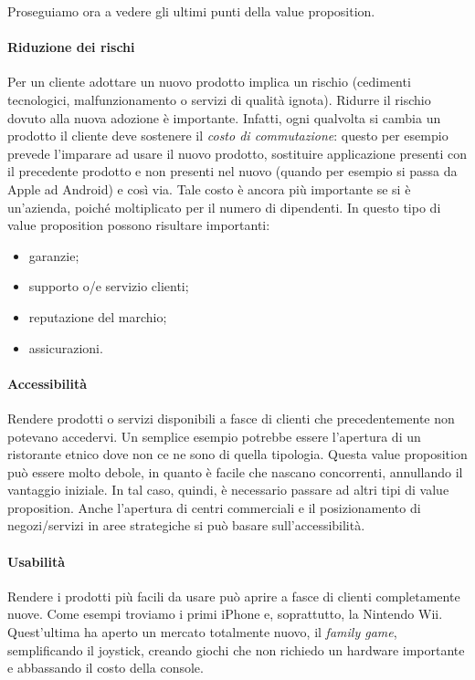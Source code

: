Proseguiamo ora a vedere gli ultimi punti della value proposition.

\paragraph*{Riduzione dei rischi} Per un cliente adottare un nuovo prodotto
implica un rischio (cedimenti tecnologici, malfunzionamento o servizi di
qualità ignota). Ridurre il rischio dovuto alla nuova adozione è importante.
Infatti, ogni qualvolta si cambia un prodotto il cliente deve sostenere il
\emph{costo di commutazione}: questo per esempio prevede l'imparare ad usare il
nuovo prodotto, sostituire applicazione presenti con il precedente prodotto e
non presenti nel nuovo (quando per esempio si passa da Apple ad Android) e così
via. Tale costo è ancora più importante se si è un'azienda, poiché moltiplicato
per il numero di dipendenti. In questo tipo di value proposition possono
risultare importanti:
\begin{itemize}
\item garanzie;
\item supporto o/e servizio clienti;
\item reputazione del marchio;
\item assicurazioni.
\end{itemize}

\paragraph*{Accessibilità} Rendere prodotti o servizi disponibili a fasce
di clienti che precedentemente non potevano accedervi. Un semplice esempio
potrebbe essere l'apertura di un ristorante etnico dove non ce ne sono di
quella tipologia. Questa value proposition può essere molto debole, in quanto
è facile che nascano concorrenti, annullando il vantaggio iniziale. In tal
caso, quindi, è necessario passare ad altri tipi di value proposition.
Anche l'apertura di centri commerciali e il posizionamento di negozi/servizi in
aree strategiche si può basare sull'accessibilità.

\paragraph*{Usabilità} Rendere i prodotti più facili da usare può aprire a
fasce di clienti completamente nuove. Come esempi troviamo i primi iPhone e,
soprattutto, la Nintendo Wii. Quest'ultima ha aperto un mercato totalmente
nuovo, il \emph{family game}, semplificando il joystick, creando giochi che non
richiedo un hardware importante e abbassando il costo della console.

